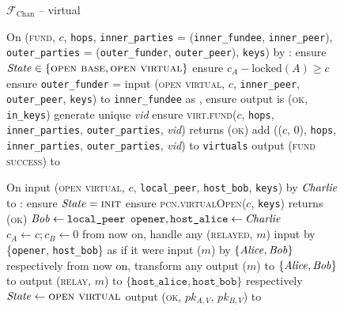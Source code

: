 \begin{figure}[H]
  \begin{systembox}{$\mathcal{F}_{\mathrm{Chan}}$ -- virtual}
    \begin{algorithmic}[1]
      \State On (\textsc{fund}, $c$, \texttt{hops}, \texttt{inner\_parties} =
      (\texttt{inner\_fundee}, \texttt{inner\_peer}), \texttt{outer\_parties} =
      (\texttt{outer\_funder}, \texttt{outer\_peer}), \texttt{keys}) by \alice:
      \label{code:functionality:chan:skeleton:virtual:fund}
      \Indent
        \State ensure $\mathit{State} \in \{\textsc{open base}, \textsc{open
        virtual}\}$
        \label{code:functionality:chan:skeleton:virtual:fund:start}
        \State ensure $c_A - \mathrm{locked}(A) \geq c$
        \State ensure \texttt{outer\_funder} = \alice
        \label{code:functionality:chan:skeleton:virtual:fund:id}
        \State input (\textsc{open virtual}, $c$, \texttt{inner\_peer},
        \texttt{outer\_peer}, \texttt{keys}) to \texttt{inner\_fundee} as
        \alice, ensure output is (\textsc{ok}, \texttt{in\_keys})
        \label{code:functionality:chan:skeleton:virtual:subfunc}
        \State generate unique \textit{vid}
        \label{code:functionality:chan:skeleton:virtual:id}
        \State ensure \textsc{virt.fund}($c$, \texttt{hops},
        \texttt{inner\_parties}, \texttt{outer\_parties}, \textit{vid}) returns
        (\textsc{ok})
        \label{code:functionality:chan:skeleton:virtual:fund:virt}
        \State add (($c$, 0), \texttt{hops}, \texttt{inner\_parties},
        \texttt{outer\_parties}, \textit{vid}) to \texttt{virtuals}
        \label{code:functionality:chan:skeleton:virtual:fund:store}
        \State output (\textsc{fund success}) to \alice
        \label{code:functionality:chan:skeleton:virtual:fund:end}
      \EndIndent
      \Statex

      \State On input (\textsc{open virtual}, $c$, \texttt{local\_peer},
      \texttt{host\_bob}, \texttt{keys}) by $\mathit{Charlie}$ to \alice:
      \label{code:functionality:chan:skeleton:virtual:open-virtual}
      \Indent
        \State ensure $\mathit{State} = \textsc{init}$
        \State ensure \textsc{pcn.virtualOpen}($c$, \texttt{keys}) returns
        (\textsc{ok})
        \label{code:functionality:chan:skeleton:virtual:ln}
        \State $\mathit{Bob} \gets \texttt{local\_peer}$
        \State $\mathtt{opener}, \texttt{host\_alice} \gets \mathit{Charlie}$
        \State $c_A \gets c; c_B \gets 0$
        \State from now on, handle any (\textsc{relayed}, $m$) input by
        \{\texttt{opener}, \texttt{host\_bob}\} as if it were input ($m$) by
        $\{\mathit{Alice}, \mathit{Bob}\}$ respectively
        \State from now on, transform any output ($m$) to $\{\mathit{Alice}, \mathit{Bob}\}$ to
        output (\textsc{relay}, $m$) to $\{\texttt{host\_alice},
        \texttt{host\_bob}\}$ respectively
        \State $\mathit{State} \gets \textsc{open virtual}$
        \State output (\textsc{ok}, $pk_{A, V}$, $pk_{B, V}$) to \charlie
      \EndIndent
      \Statex


\end{algorithmic}
\end{systembox}
\end{figure}
